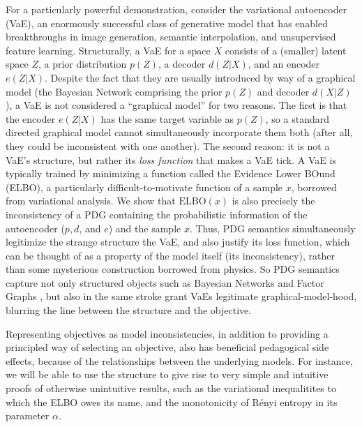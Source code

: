 \documentclass{article}
\theoremstyle{plain}
\theoremstyle{definition}
\begin{document}
For a particularly powerful demonstration, consider the variational autoencoder (VaE), an enormously successful class of generative model that has enabled breakthroughs in image generation, semantic interpolation, and unsupervised feature learning.
Structurally, a VaE for a space $X$ consists of a (smaller) latent space $Z$, a prior distribution $p(Z)$, a decoder $d(Z | X)$, and an encoder $e(Z| X)$.
Despite the fact that they are usually introduced by way of a graphical model (the Bayesian Network 
comprising the prior $p(Z)$ and decoder $d(X|Z)$), a VaE is not considered a ``graphical model'' for two reasons. 
The first is that the encoder $e(Z|X)$ has the same target variable as $p(Z)$, so a standard directed graphical model cannot simultaneously incorporate them both (after all, they could be inconsistent with one another). 
The second reason: it is not a VaE's structure, but rather its \emph{loss function} that makes a VaE tick. A VaE is typically trained by minimizing a function called the Evidence Lower BOund (ELBO), a particularly difficult-to-motivate function of a sample $x$, borrowed from variational analysis. 
We show that $\mathrm{ELBO}(x)$ is also precisely the inconsistency of a PDG containing the probabilistic information of the autoencoder ($p, d$, and $e$) and the sample $x$. 
Thus, PDG semantics simultaneously legitimize the strange structure the VaE, and also justify its loss function, which can be thought of as a property of the model itself (its inconsistency), rather than some mysterious construction borrowed from physics.
So PDG semantics capture not only structured objects such as Bayesian Networks and Factor Graphs \cite{richardson2020probabilistic}, but also in the same stroke grant VaEs legitimate graphical-model-hood, blurring the line between the structure and the objective.




Representing objectives as model inconsistencies, in addition to providing a principled way of selecting an objective, also has beneficial pedagogical side effects, because of the relationships between the underlying models.
For instance, we will be able to use the structure to give rise to very simple and intuitive proofs of otherwise unintuitive results, such as the variational inequalitites to which the ELBO owes its name, and the monotonicity of R\'enyi entropy  in its parameter $\alpha$.

\end{document}
